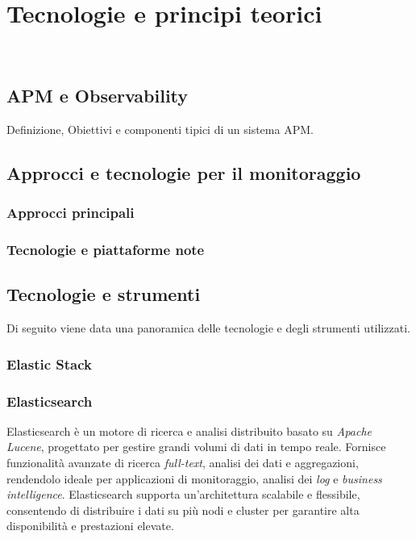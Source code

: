 \chapter{Tecnologie e principi teorici}
\label{cap:tecnologie-principi-teorici}

\\

\section{APM e Observability}
\label{sec:apm-observability}
Definizione, Obiettivi e componenti tipici di un sistema APM.


\section{Approcci e tecnologie per il monitoraggio}
\label{sec:approcci-tecnologie-monitoraggio}

\subsection{Approcci principali}


\subsection{Tecnologie e piattaforme note}


\section{Tecnologie e strumenti}
\label{sec:tecnologie-strumenti}
Di seguito viene data una panoramica delle tecnologie e degli strumenti utilizzati.

\subsection{Elastic Stack}

\subsection*{Elasticsearch}
Elasticsearch è un motore di ricerca e analisi distribuito basato su \emph{Apache Lucene}, progettato per gestire grandi volumi di dati in tempo reale. Fornisce funzionalità avanzate di ricerca \emph{full-text}, analisi dei dati e aggregazioni, rendendolo ideale per applicazioni di monitoraggio, analisi dei \emph{log} e \emph{business intelligence}. Elasticsearch supporta un'architettura scalabile e flessibile, consentendo di distribuire i dati su più nodi e cluster per garantire alta disponibilità e prestazioni elevate.


